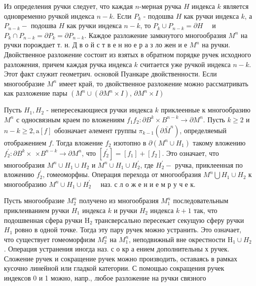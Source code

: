 \documentclass[10pt]{article}
\begin{document}
Из определения ручки следует, что каждая $n$-мерная ручка $H$ индекса $k$ является одновременно ручкой индекса $n-k$. Если $P_{k}$ - подошва $H$ как ручки индекса $k$, а $P_{n-k}-$ подошва $H$ как ручки индекса $n-k$, то $P_{k} \cup P_{n-k}=\partial H \quad$ и $P_{k} \cap P_{n-k}=\partial P_{k}=\partial P_{n-k}$. Каждое разложение замкнутого многообразия $M^{n}$ на ручки порождает т. н. Д в о й с т в е н но е р а з ло жен и е $M^{n}$ на ручки. Двойственное разложение состоит из взятых в обратном порядке ручек исходного разложения, причем каждая ручка индекса $k$ считается уже ручкой индекса $n-k$. Этот факт служит геометрич. основой Пуанкаре двойственности. Если многообразие $M^{n}$ имеет край, то двойственное разложение можно рассматривать как разложение пары $\left(M^{n} \cup\left(\partial M^{n} \times I\right)\right.$, $\left.\partial M^{n} \times I\right)$



Пусть $H_{1}, H_{2}$ - непересекающиеся ручки индекса $k$ приклеенные к многообразию $M^{n}$ с односвязным краем по вложениям $f_{1} f_{2}: \partial B^{k} \times B^{n-k} \rightarrow \partial M^{n}$. Пусть $k \geqslant 2$ и $n-k \geqslant 2, \mathrm{a}[f]$ обозначает әлемент группы $\pi_{k-1}\left(\partial \bar{M}^{n}\right)$, определяемый отображением $f$. Тогда вложение $f_{2}$ изотопно в $\partial\left(M^{n} \cup H_{1}\right)$ такому вложению $f_{2}^{\prime}: \partial B^{k} \times$ $\times B^{n-k} \rightarrow \partial M^{n}$, что $\left[f_{2}^{\prime}\right]=\left[f_{1}\right]+\left[f_{2}\right]$. Это означает, что многообразия $M^{n} \cup H_{1} \cup H_{2}$ и $M^{n} \cup H_{1} \cup H_{2}^{\prime}$, где $H_{2}^{\prime}-$ ручка, приклеенная по вложению $f_{2}^{\prime}$, гомеоморфны. Операция перехода от многообразия $M^{n} \bigcup H_{1} \cup H_{2}$ к многообразию $M^{n} \cup H_{1} \cup H_{2}^{\prime} \quad$ наз. с л о ж е н и е м р у ч е к.



Пусть многообразие $M_{2}^{n}$ получено из многообразия $M_{1}^{n}$ последовательным приклеиванием ручки $H_{1}$ индекса $k$ и ручки $H_{2}$ индекса $k+1$ так, что подошвенная сфера ручки $\mathrm{H}_{2}$ трансверсально пересекает секущую сферу ручки $H_{1}$ ровно в одной точке. Тогда эту пару ручек можно устранить. Это означает, что существует гомеоморфизм $M_{2}^{n}$ на $M_{1}^{n}$, неподвижный вне окрестности $\mathrm{H}_{1} \cup H_{2}$. Операция устранения иногда наз. с о кр а ением дополнительны х ручек. Сложение ручек и сокращение ручек можно производить, оставаясь в рамках кусочно линейной или гладкой категории. С помощью сокращения ручек индексов 0 и 1 можно, напр., любое разложение на ручки связного
\end{document}
